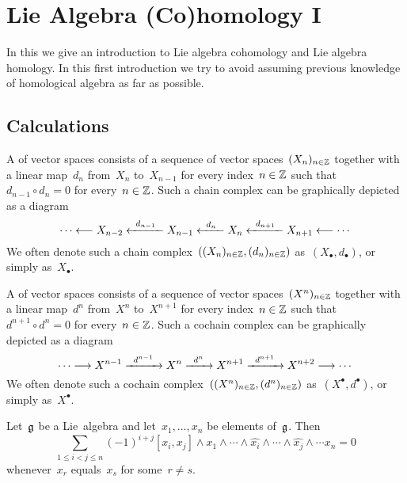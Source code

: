 \chapter{Lie Algebra (Co)homology I}
\label{lie algebra cohomology}


\begin{fluff}
  In this  we give an introduction to Lie algebra cohomology and Lie algebra homology.
  In this first introduction we try to avoid assuming previous knowledge of homological algebra as far as possible.
\end{fluff}





\section{Calculations}

\begin{recall}
  A  of vector spaces consists of a sequence of vector spaces~$(X_n)_{n \in \mathbb{Z}}$ together with a linear map~$d_n$ from~$X_n$ to~$X_{n-1}$ for every index~$n \in \mathbb{Z}$ such that~$d_{n-1} \circ d_n = 0$ for every~$n \in \mathbb{Z}$.
  Such a chain complex can be graphically depicted as a diagram
  \[
    \dotsb
    \from
    X_{n-2}
    \xfrom{d_{n-1}}
    X_{n-1}
    \xfrom{d_n}
    X_n
    \xfrom{d_{n+1}}
    X_{n+1}
    \from
    \dotsb
  \]
  We often denote such a chain complex~$( (X_n)_{n \in \mathbb{Z}}, (d_n)_{n \in \mathbb{Z}} )$ as~$(X_\bullet, d_\bullet)$, or simply as~$X_\bullet$.

  A  of vector spaces consists of a sequence of vector spaces~$(X^n)_{n \in \mathbb{Z}}$ together with a linear map~$d^n$ from~$X^n$ to~$X^{n+1}$ for every index~$n \in \mathbb{Z}$ such that~$d^{n+1} \circ d^n = 0$ for every~$n \in \mathbb{Z}$.
  Such a cochain complex can be graphically depicted as a diagram
  \[
    \dotsb
    \to
    X^{n-1}
    \xto{d^{n-1}}
    X^n
    \xto{d^n}
    X^{n+1}
    \xto{d^{n+1}}
    X^{n+2}
    \to
    \dotsb
  \]
  We often denote such a cochain complex~$( (X^n)_{n \in \mathbb{Z}}, (d^n)_{n \in \mathbb{Z}} )$ as~$(X^\bullet, d^\bullet)$, or simply as~$X^\bullet$.
\end{recall}


\begin{lemma}
  \label{alternating in multiple arguments}
  Let~$\mathfrak{g}$ be a Lie~algebra and let~$x_1, \dotsc, x_n$ be elements of~$\mathfrak{g}$.
  Then
  \[
    \sum_{1 \leq i < j \leq n}
    (-1)^{i+j}
    [x_i, x_j] \wedge x_1 \wedge \dotsb \wedge \widehat{x_i} \wedge \dotsb \wedge \widehat{x_j} \wedge \dotsb x_n
    =
    0
  \]
  whenever~$x_r$ equals~$x_s$ for some~$r \neq s$.
\end{lemma}



